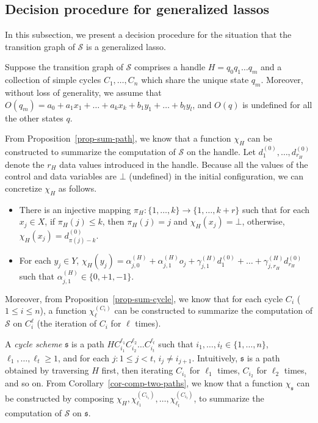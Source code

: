 \documentclass[runningheads,a4paper]{llncs}
\def\Ss{{\mathcal{S} }}
\def\schm{{\mathfrak{s} }}
\begin{document}
\subsection{Decision procedure for generalized lassos}

In this subsection, we present a decision procedure for the situation that the transition graph of $\Ss$ is a generalized lasso. 

Suppose the transition graph of $\Ss$ comprises a handle $H=q_0 q_1 \dots q_m$ and a collection of simple cycles $C_1,\dots,C_n$ which share the unique state $q_m$. Moreover, without loss of generality, we assume that $O(q_m) = a_0 + a_1 x_1 + \dots + a_k x_k + b_1 y_1 + \dots + b_l y_l$, and $O(q)$ is undefined for all the other states $q$.

From Proposition~\ref{prop-sum-path}, we know that a function $\chi_H$ can be constructed to summarize the computation of $\Ss$ on the handle. Let $d^{(0)}_{1}, \dots, d^{(0)}_{r_H}$ denote the $r_H$ data values introduced in the handle. Because all the values of the control and data variables are $\bot$ (undefined) in the initial configuration,  we can concretize $\chi_H$ as follows. 
\begin{itemize}
\item There is an injective mapping $\pi_H: \{1,\dots,k\} \rightarrow \{1,\dots, k+r\}$ such that for each $x_j \in X$, if $\pi_H(j) \le k$, then $\pi_H(j)=j$ and $\chi_H(x_j)=\bot$, otherwise, $\chi_H(x_j)=d^{(0)}_{\pi(j)-k}$.
% 
\item For each $y_j \in Y$, $\chi_H(y_j) = \alpha^{(H)}_{j,0} + \alpha^{(H)}_{j,1} o_j + \gamma^{(H)}_{j,1} d^{(0)}_1 +\dots + \gamma^{(H)}_{j,r_H} d^{(0)}_{r_H}$ such that $\alpha^{(H)}_{j,1} \in \{0,+1,-1\}$.
\end{itemize}

Moreover, from Proposition~\ref{prop-sum-cycle}, we know that for each cycle $C_i$ ($1 \le i \le n$), a function $\chi^{(C_i)}_{\ell}$ can be constructed to summarize the computation of $\Ss$ on $C^{\ell}_i$ (the iteration of $C_i$ for $\ell$ times).

A \emph{cycle scheme} $\schm$ is a path $H C_{i_1}^{\ell_1} C_{i_2}^{\ell_2} \dots C_{i_t}^{\ell_t}$ such that $i_1,\dots,i_t \in \{1,\dots,n\}$, $\ell_1,\dots, \ell_t \ge 1$, and for each $j: 1 \le j < t$, $i_j \neq i_{j+1}$. Intuitively, $\schm$ is a path obtained by traversing $H$ first, then iterating $C_{i_1}$ for $\ell_1$ times, $C_{i_2}$ for $\ell_2$ times, and so on. From Corollary~\ref{cor-comp-two-paths}, we know that a function $\chi_{\schm}$ can be constructed by composing $\chi_{H}, \chi^{(C_{i_1})}_{\ell_1},\dots,\chi^{(C_{i_t})}_{\ell_t}$, to summarize the computation of $\Ss$ on $\schm$.
\end{document}
